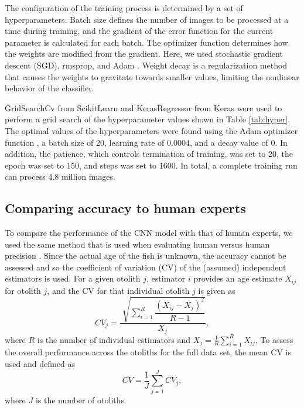 \documentclass[10pt,letterpaper]{article}
\begin{document}
The configuration of the training process is determined by a set of hyperparameters.
Batch size defines the number of images to be processed at a time during training, and the gradient of the error function for the current parameter is calculated for each batch.
The optimizer function determines how the weights are modified from the gradient.  Here, we used stochastic gradient descent (SGD), rmsprop, and Adam \citep{kingma2014adam}.
Weight decay is a regularization method that causes the weights to gravitate towards smaller values, limiting the nonlinear behavior of the classifier.

GridSearchCv from ScikitLearn \citep{scipy} and KerasRegressor from Keras were used to perform a grid search of the hyperparameter values shown in Table \ref{tab:hyper}.
The optimal values of the hyperparameters were found using the Adam optimizer function \citep{kingma2014adam}, a batch size of 20, learning rate of 0.0004, and a decay value of 0.
In addition, the patience, which controls termination of training, was set to 20, the epoch was set to 150, and steps was set to 1600. In total, a complete training run can process 4.8 million images.

\subsection*{Comparing accuracy to human experts}

To compare the performance of the CNN model with that of human experts, we used the same method that is used when evaluating human versus human precision \citep{campana1995graphical}. 
Since the actual age of the fish is unknown, the accuracy cannot be assessed and so the coefficient of variation (CV) of the (assumed) independent estimators is used. For a given otolith $j$, estimator $i$ provides an age estimate $X_{ij}$ for otolith $j$, and the CV for that individual otolith $j$ is given as 
\begin{equation}
\label{eq:CVj}
CV_j = \dfrac{\sqrt[]{\sum_{i=1}^{R} \dfrac{(X_{ij} - X_j)^2 }{R-1} } }  {X_j}, 
\end{equation}
where $R$ is the number of individual estimators and $X_j=\frac{1}{R}\sum_{i=1}^{R} X_{ij}$. To assess the overall performance across the otoliths for the full data set, the mean CV is used and defined as
\begin{equation}
\label{eq:CV}
\overline{CV} = \dfrac{1}{J} {\sum_{j=1}^{J}  CV_j},
\end{equation}
where $J$ is the number of otoliths. 
\end{document}
